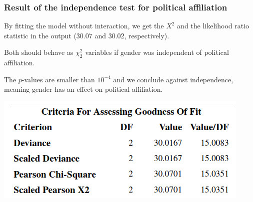 \documentclass{beamer}
\begin{document}
\begin{frame}
 \frametitle{Result of the independence test for political affiliation}
   \bi \item     
By fitting the model without interaction, we get the $X^2$ and the likelihood ratio statistic in the output ($30.07$ and $30.02$, respectively).
\item Both should behave as $\chi^2_2$ variables if gender was independent of political affiliation. 
\item The $p$-values are smaller than $10^{-4}$ and we conclude against independence, meaning gender has an effect on political affiliation.
\ei
\begin{center}
 \includegraphics[width = 0.6\linewidth]{img/c4/slides8-e1}
\end{center}
\end{frame}
\end{document}
